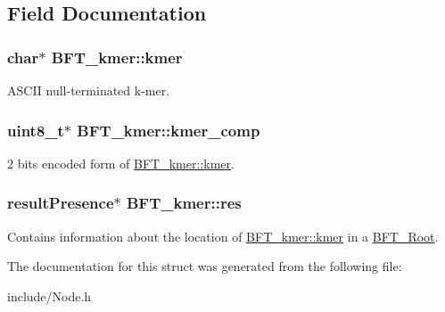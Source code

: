 \subsection{Field Documentation}
\hypertarget{structBFT__kmer_ae4cf6766f01ebfa54fe51d0e60bec942}{}
\subsubsection[{kmer}]{\setlength{\rightskip}{0pt plus 5cm}char$\ast$ B\+F\+T\+\_\+kmer\+::kmer}\label{structBFT__kmer_ae4cf6766f01ebfa54fe51d0e60bec942}


A\+S\+C\+I\+I null-\/terminated k-\/mer. 

\hypertarget{structBFT__kmer_a9935a78617deffcf7a24fcca0143962c}{}
\subsubsection[{kmer\+\_\+comp}]{\setlength{\rightskip}{0pt plus 5cm}uint8\+\_\+t$\ast$ B\+F\+T\+\_\+kmer\+::kmer\+\_\+comp}\label{structBFT__kmer_a9935a78617deffcf7a24fcca0143962c}


2 bits encoded form of \hyperlink{structBFT__kmer_ae4cf6766f01ebfa54fe51d0e60bec942}{B\+F\+T\+\_\+kmer\+::kmer}. 

\hypertarget{structBFT__kmer_aab6ab4e17d069ebb9e5c467d8fee5002}{}
\subsubsection[{res}]{\setlength{\rightskip}{0pt plus 5cm}result\+Presence$\ast$ B\+F\+T\+\_\+kmer\+::res}\label{structBFT__kmer_aab6ab4e17d069ebb9e5c467d8fee5002}


Contains information about the location of \hyperlink{structBFT__kmer_ae4cf6766f01ebfa54fe51d0e60bec942}{B\+F\+T\+\_\+kmer\+::kmer} in a \hyperlink{structBFT__Root}{B\+F\+T\+\_\+\+Root}. 



The documentation for this struct was generated from the following file\+:\begin{DoxyCompactItemize}
\item 
include/Node.\+h\end{DoxyCompactItemize}
